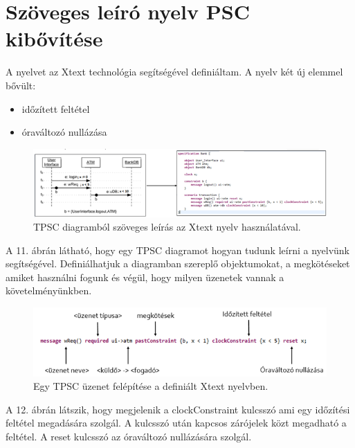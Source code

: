 \chapter{Szöveges leíró nyelv PSC kibővítése}

A nyelvet az Xtext technológia segítségével definiáltam. A nyelv két új elemmel bővült:
\begin{itemize}
    \item időzített feltétel
    \item óraváltozó nullázása
\end{itemize}

\begin{figure}[!ht]
    \centering
    \includegraphics[width=150mm, keepaspectratio]{figures/11abra.png}
    \caption{TPSC diagramból szöveges leírás az Xtext nyelv használatával.}
\end{figure}

A 11. ábrán látható, hogy egy TPSC diagramot hogyan tudunk leírni a nyelvünk segítségével. Definiálhatjuk a diagramban szereplő objektumokat, a megkötéseket amiket használni fogunk és végül, hogy milyen üzenetek vannak a követelményünkben.

\begin{figure}[!ht]
    \centering
    \includegraphics[width=150mm, keepaspectratio]{figures/12abra.png}
    \caption{Egy TPSC üzenet felépítése a definiált Xtext nyelvben.}
\end{figure}

A 12. ábrán látszik, hogy megjelenik a clockConstraint kulcsszó ami egy időzítési feltétel megadására szolgál. A kulcsszó után kapcsos zárójelek közt megadható a feltétel. A reset kulcsszó az óraváltozó nullázására szolgál.